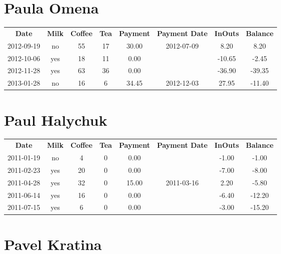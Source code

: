\section{Paula Omena}

\begin{center}
\begin{tabular}{cccccccc}
\textbf{Date} & \textbf{Milk} & \textbf{Coffee} & \textbf{Tea} & \textbf{Payment} & \textbf{Payment Date} & \textbf{InOuts} & \textbf{Balance} \\
2012-09-19 & no & 55 & 17 & 30.00 & 2012-07-09 &   8.20 &   8.20\\ 
2012-10-06 & yes & 18 & 11 &  0.00 &  & -10.65 &  -2.45\\ 
2012-11-28 & yes & 63 & 36 &  0.00 &  & -36.90 & -39.35\\ 
2013-01-28 & no & 16 &  6 & 34.45 & 2012-12-03 &  27.95 & -11.40
\end{tabular}
\end{center}

\section{Paul Halychuk}

\begin{center}
\begin{tabular}{cccccccc}
\textbf{Date} & \textbf{Milk} & \textbf{Coffee} & \textbf{Tea} & \textbf{Payment} & \textbf{Payment Date} & \textbf{InOuts} & \textbf{Balance} \\
2011-01-19 & no &  4 & 0 &  0.00 &  & -1.00 &  -1.00\\ 
2011-02-23 & yes & 20 & 0 &  0.00 &  & -7.00 &  -8.00\\ 
2011-04-28 & yes & 32 & 0 & 15.00 & 2011-03-16 &  2.20 &  -5.80\\ 
2011-06-14 & yes & 16 & 0 &  0.00 &  & -6.40 & -12.20\\ 
2011-07-15 & yes &  6 & 0 &  0.00 &  & -3.00 & -15.20
\end{tabular}
\end{center}

\section{Pavel Kratina}

